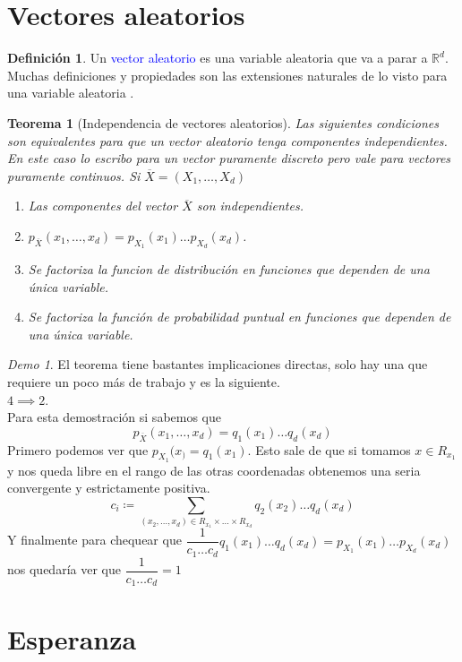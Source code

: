 \documentclass[11pt]{article}
\theoremstyle{plain} %
\newtheorem{teorema}{Teorema}
\theoremstyle{definition}
\newtheorem*{definicion}{Definici\'{o}n} %
\theoremstyle{remark}
\newtheorem*{demo}{Demo}
\def\R{\mathbb{R}}
\def\va{variable aleatoria }
\def\blue{\textcolor{blue}}
\newcommand{\X}{\overline{X}}
\begin{document}
\section{Vectores aleatorios}

\begin{definicion}
	Un \blue{vector aleatorio} es una \va que va a parar a $\R^d$. Muchas definiciones y propiedades son las extensiones naturales de lo visto para una \va.
\end{definicion}

\begin{teorema}
	[Independencia de vectores aleatorios]
	Las siguientes condiciones son equivalentes para que un vector aleatorio tenga componentes independientes. En este caso lo escribo para un vector puramente discreto pero vale para vectores puramente continuos. Si $\overline{X} = \left( X_1, \dots , X_d \right)$
	\begin{enumerate}
		\item Las componentes del vector $\X$ son independientes.
		\item $p_{\X} (x_1,\dots,x_d) = p_{X_1}(x_1) \dots p_{X_d}(x_d)$.
		\item  Se factoriza la funcion de distribuci\'on en funciones que dependen de una \'unica variable.
		\item Se factoriza la funci\'on de probabilidad puntual en funciones que dependen de una \'unica variable.
		
	\end{enumerate}
\end{teorema}

\begin{demo}
	El teorema tiene bastantes implicaciones directas, solo hay una que requiere un poco m\'as de trabajo y es la siguiente.\\
	$4 \implies 2$.\\
	Para esta demostraci\'on si sabemos que 
	\[p_{\X} (x_1,\dots,x_d) = q_{1}(x_1) \dots q_{d}(x_d)\]
	Primero podemos ver que $p_{X_1}(x_) = q_{1}(x_1)$. Esto sale de que si tomamos $x \in R_{x_1}$ y nos queda libre en el rango de las otras coordenadas obtenemos una seria convergente y estrictamente positiva.
	\[c_i \coloneqq \sum_{(x_2, \dots, x_d) \in R_{x_1} \times \dots \times R_{x_d}} q_{2}(x_2) \dots q_{d}(x_d)  \]
	Y finalmente para chequear  que $\dfrac{1}{c_1\dots c_d}q_{1}(x_1) \dots q_{d}(x_d) = p_{X_{1}}(x_1) \dots p_{X_d}(x_d)$ nos quedar\'ia ver que $\dfrac{1}{c_1\dots c_d}=1$
\end{demo}

\bigskip

\section{Esperanza}
\end{document}
